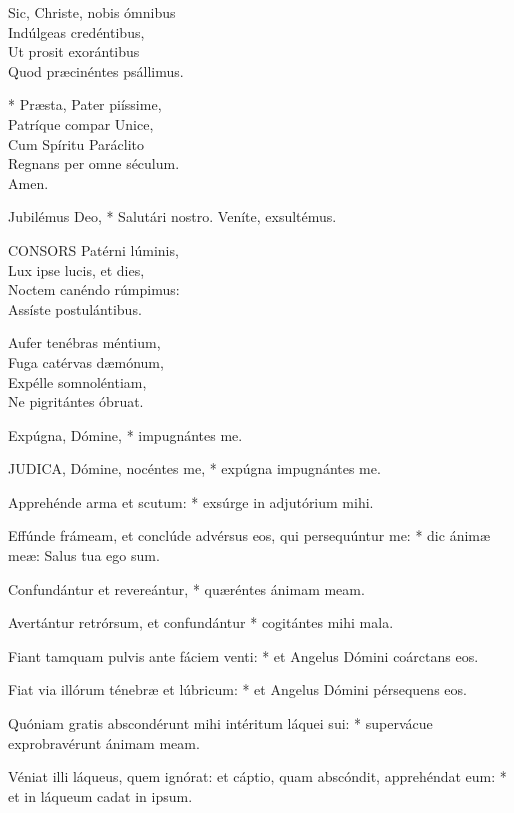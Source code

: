 Sic, Christe, nobis ómnibus\\
Indúlgeas credéntibus,\\
Ut prosit exorántibus\\
Quod præcinéntes psállimus.

* Præsta, Pater piíssime,\\
Patríque compar Unice,\\
Cum Spíritu Paráclito\\
Regnans per omne séculum.\\
Amen.


 Jubilémus Deo, * Salutári nostro.  Veníte, exsultémus.


\lettrine[lines=2]{C}{ONSORS} Patérni lúminis,\\
Lux ipse lucis, et dies,\\
Noctem canéndo rúmpimus:\\
Assíste postulántibus.

Aufer tenébras méntium,\\
Fuga catérvas dæmónum,\\
Expélle somnoléntiam,\\
Ne pigritántes óbruat.


 Expúgna, Dómine, * impugnántes me.


\lettrine[lines=2]{J}{UDICA}, Dómine, nocéntes me, * expúgna impugnántes me.

Apprehénde arma et scutum: * exsúrge in adjutórium mihi.

Effúnde frámeam, et conclúde advérsus eos, qui persequúntur me: * dic ánimæ meæ: Salus tua ego sum.

Confundántur et revereántur, * quæréntes ánimam meam.

Avertántur retrórsum, et confundántur * cogitántes mihi mala.

Fiant tamquam pulvis ante fáciem venti: * et Angelus Dómini coárctans eos.

Fiat via illórum ténebræ et lúbricum: * et Angelus Dómini pérsequens eos.

Quóniam gratis abscondérunt mihi intéritum láquei sui: * supervácue exprobravérunt ánimam meam.

Véniat illi láqueus, quem ignórat: et cáptio, quam abscóndit, apprehéndat eum: * et in láqueum cadat in ipsum.

